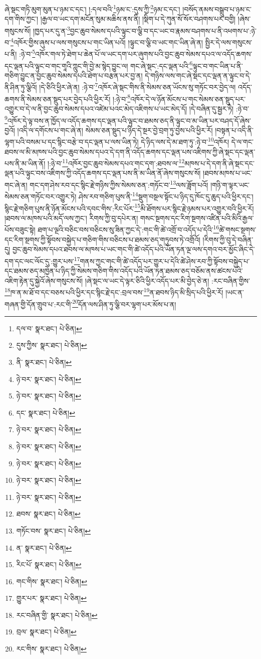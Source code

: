 ཞེ་སྡང་གཏི་མུག་མུན་པ་ཉམ་ང་དང་། །:དལ་བའི་\footnote{དལ་བ་  སྣར་ཐང་།  པེ་ཅིན། }ཉམ་ང་:དུས་ཀྱི་\footnote{དུས་ཀྱིས་  སྣར་ཐང་།  པེ་ཅིན། }ཉམ་ང་དང་། །བསོད་ནམས་བསྒྲུབ་པ་ཉམ་ང་དག་གིས་ཀྱང་། །རྒྱལ་བ་ཡང་དག་མངོན་སུམ་མཆིས་ནས་ནི། །སྡིག་པ་དེ་ཀུན་སོ་སོར་བཤགས་པར་བགྱི། །ཞེས་གསུངས་སོ། །ཁྱད་པར་དུ་ན་\footnote{ནི་  སྣར་ཐང་།  པེ་ཅིན། }བྱང་ཆུབ་སེམས་དཔའི་ལྟུང་བ་ལྕི་བ་དང་ཡང་བ་རྣམས་བཤགས་པ་ནི་འཕགས་པ་:ཉེ་བ་\footnote{ཉེ་བར་  སྣར་ཐང་།  པེ་ཅིན། }འཁོར་གྱིས་ཞུས་པ་ལས་གསུངས་པ་གང་ཡིན་པའོ། །ལྟུང་བ་ལྕི་བ་ཡང་གང་ཡིན་ཞེ་ན། སྤྱིར་དེ་ལས་གསུངས་པ་ནི། :ཉེ་བ་\footnote{ཉེ་བར་  སྣར་ཐང་།  པེ་ཅིན། }འཁོར་གལ་ཏེ་ཐེག་པ་ཆེན་པོ་ལ་ཡང་དག་པར་ཞུགས་པའི་བྱང་ཆུབ་སེམས་དཔའ་ལ་འདོད་ཆགས་དང་ལྡན་པའི་ལྟུང་བ་གང་གཱའི་ཀླུང་གི་བྱེ་མ་སྙེད་བྱུང་ལ། གང་ཞེ་སྡང་:དང་ལྡན་པའི་\footnote{དང་  སྣར་ཐང་།  པེ་ཅིན། }ལྟུང་བ་གང་ཡིན་པ་ནི་གཅིག་བྱུང་ན་བྱང་ཆུབ་སེམས་དཔའི་ཐེག་པ་བརྩན་པར་བྱ་ན། དེ་གཉིས་ལས་གང་ཞེ་སྡང་དང་ལྡན་ན་ལྟུང་བ་དེ་ནི་ཤིན་ཏུ་ལྕིའོ། །དེ་ཅིའི་ཕྱིར་ཞེ་ན། :ཉེ་བ་\footnote{ཉེ་བར་  སྣར་ཐང་།  པེ་ཅིན། }འཁོར་ཞེ་སྡང་གིས་ནི་སེམས་ཅན་ཡོངས་སུ་གཏོང་བར་བྱེད་ལ། འདོད་ཆགས་ནི་སེམས་ཅན་སྡུད་པར་བྱེད་པའི་ཕྱིར་རོ། །:ཉེ་བ་\footnote{ཉེ་བར་  སྣར་ཐང་།  པེ་ཅིན། }འཁོར་དེ་ལ་ཉོན་མོངས་པ་གང་སེམས་ཅན་སྡུད་པར་འགྱུར་བ་དེ་ལ་ནི་བྱང་ཆུབ་སེམས་དཔའ་འཛེམ་པའང་མེད་འཇིགས་པ་ཡང་མེད་དོ། །དེ་བཞིན་དུ་སྦྱར་ཏེ། :ཉེ་བ་\footnote{ཉེ་བར་  སྣར་ཐང་།  པེ་ཅིན། }འཁོར་དེ་ལྟ་བས་ན་ཁྱོད་ལ་འདོད་ཆགས་དང་ལྡན་པའི་ལྟུང་བ་ཐམས་ཅད་ནི་ལྟུང་བ་མ་ཡིན་པར་བཤད་དོ་ཞེས་བྱའོ། །འདི་ལ་དགོངས་པ་གང་ཞེ་ན། སེམས་ཅན་སྡུད་པ་ཉིད་དེ་སྔར་བྱེ་བྲག་ཏུ་བྱས་པའི་ཕྱིར་རོ། །བསྟན་པ་འདི་ནི་ལྷག་པའི་བསམ་པ་དང་སྙིང་བརྩེ་བ་དང་ལྡན་པ་ལས་ཡིན་ཏེ། དེ་ཉིད་ལས་དེ་མ་ཐག་ཏུ་:ཉེ་བ་\footnote{ཉེ་བར་  སྣར་ཐང་།  པེ་ཅིན། }འཁོར། དེ་ལ་གང་ཐབས་ལ་མི་མཁས་པའི་བྱང་ཆུབ་སེམས་དཔའ་དེ་དག་ནི་འདོད་ཆགས་དང་ལྡན་པས་འཇིགས་ཀྱི་ཞེ་སྡང་དང་ལྡན་པས་ནི་མ་ཡིན་ནོ། །:ཉེ་བ་\footnote{ཉེ་བར་  སྣར་ཐང་།  པེ་ཅིན། }འཁོར་བྱང་ཆུབ་སེམས་དཔའ་གང་དག་:ཐབས་ལ་\footnote{ཐབས་  སྣར་ཐང་།  པེ་ཅིན། }མཁས་པ་དེ་དག་ནི་ཞེ་སྡང་དང་ལྡན་པའི་ལྟུང་བས་འཇིགས་ཀྱི་འདོད་ཆགས་དང་ལྡན་པས་ནི་མ་ཡིན་ནོ་ཞེས་གསུངས་སོ། །ཐབས་མཁས་པ་ཡང་གང་ཞེ་ན། གང་དག་ཤེས་རབ་དང་སྙིང་རྗེ་གཉིས་ཀྱིས་སེམས་ཅན་:གཏོང་བ་\footnote{གཏོང་བས་  སྣར་ཐང་།  པེ་ཅིན། }ལས་ཟློག་པའོ། །གཉི་ག་ལྟར་ཡང་སེམས་ཅན་གཏོང་བར་འགྱུར་ཏེ། ཤེས་རབ་གཅིག་པུས་ནི་\footnote{ན་  སྣར་ཐང་།  པེ་ཅིན། }སྡུག་བསྔལ་སྟོང་པ་ཉིད་དུ་ཁོང་དུ་ཆུད་པའི་ཕྱིར་དང་། སྙིང་རྗེ་གཅིག་པུས་ནི་ཉོན་མོངས་པའི་དབང་གིས་:རིང་པོར་\footnote{རིང་པོ་  སྣར་ཐང་།  པེ་ཅིན། }མི་ཐོགས་པར་སྙིང་རྗེ་ཉམས་པར་འགྱུར་བའི་ཕྱིར་རོ། །ཐབས་ལ་མཁས་པའི་མདོ་ལས་ཀྱང་། རིགས་ཀྱི་བུ་དཔེར་ན། གསང་སྔགས་དང་རིག་སྔགས་འཛིན་པའི་མིའི་རྒྱལ་པོས་བཟུང་སྟེ། ཐག་པ་ལྔའི་བཅིང་བས་བཅིངས་སུ་ཟིན་ཀྱང་དེ་:གང་གི་ཚེ་འགྲོ་བ་འདོད་པ་དེའི་\footnote{གང་གིས་  སྣར་ཐང་།  པེ་ཅིན། }ཚེ་གསང་སྔགས་དང་རིག་སྔགས་ཀྱི་སྟོབས་བསྐྱེད་པ་གཅིག་གིས་བཅིངས་པ་ཐམས་ཅད་གཏུབས་ཏེ་འགྲོའོ། །རིགས་ཀྱི་བུ་དེ་བཞིན་དུ། བྱང་ཆུབ་སེམས་དཔའ་ཐབས་ལ་མཁས་པ་ཡང་གང་གི་ཚེ་འདོད་པའི་ཡོན་ཏན་ལྔ་ལས་དགའ་བར་མྱོང་ཞིང་དེ་དག་དང་ལང་ལོང་དུ་:གྱུར་པས་\footnote{གྱུར་པར་  སྣར་ཐང་།  པེ་ཅིན། }གནས་ཀྱང་གང་གི་ཚེ་འདོད་པར་གྱུར་པ་དེའི་ཚེ་ཤེས་རབ་ཀྱི་སྟོབས་བསྐྱེད་པ་དང་ཐམས་ཅད་མཁྱེན་པ་ཉིད་ཀྱི་སེམས་གཅིག་གིས་འདོད་པའི་ཡོན་ཏན་ཐམས་ཅད་བཅོམ་ནས་ཚངས་པའི་འཇིག་རྟེན་དུ་སྐྱེའོ་ཞེས་གསུངས་སོ། །ཞེ་སྡང་ལ་ཡང་དེ་ལྟར་ཅིའི་ཕྱིར་འདོད་པར་མི་བྱེད་ཅེ་ན། :རང་བཞིན་གྱིས་\footnote{རང་བཞིན་གྱི་  སྣར་ཐང་།  པེ་ཅིན། }ཁ་ན་མ་ཐོ་བ་དང་བཅས་པའི་ཕྱིར་དང་སྙིང་རྗེ་དང་:བྲལ་བས་\footnote{བྲལ་  སྣར་ཐང་།  པེ་ཅིན། }ན་ཐབས་ཉིད་མི་སྲིད་པའི་ཕྱིར་རོ། །ཡང་ན་གཞན་གྱི་དོན་གྲུབ་པ་:རང་གི་\footnote{རང་གིས་  སྣར་ཐང་།  པེ་ཅིན། }དོན་ལས་ཤིན་ཏུ་ལྕི་བར་ལྷག་པར་མོས་པ་ན། 